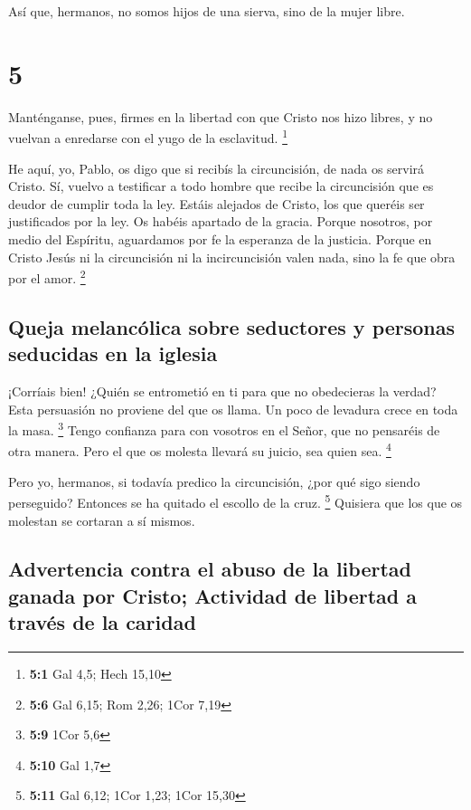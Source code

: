  Así que, hermanos, no somos hijos de una sierva, sino de
la mujer libre.

\hypertarget{section-4}{%
\section{5}\label{section-4}}

 Manténganse, pues, firmes en la libertad con que Cristo
nos hizo libres, y no vuelvan a enredarse con el yugo de la esclavitud.
\footnote{\textbf{5:1} Gal 4,5; Hech 15,10}

 He aquí, yo, Pablo, os digo que si recibís la
circuncisión, de nada os servirá Cristo.  Sí, vuelvo a
testificar a todo hombre que recibe la circuncisión que es deudor de
cumplir toda la ley.  Estáis alejados de Cristo, los que
queréis ser justificados por la ley. Os habéis apartado de la gracia.
 Porque nosotros, por medio del Espíritu, aguardamos por
fe la esperanza de la justicia.  Porque en Cristo Jesús ni
la circuncisión ni la incircuncisión valen nada, sino la fe que obra por
el amor. \footnote{\textbf{5:6} Gal 6,15; Rom 2,26; 1Cor 7,19}

\hypertarget{queja-melancuxf3lica-sobre-seductores-y-personas-seducidas-en-la-iglesia}{%
\subsection{Queja melancólica sobre seductores y personas seducidas en
la
iglesia}\label{queja-melancuxf3lica-sobre-seductores-y-personas-seducidas-en-la-iglesia}}

 ¡Corríais bien! ¿Quién se entrometió en ti para que no
obedecieras la verdad?  Esta persuasión no proviene del
que os llama.  Un poco de levadura crece en toda la masa.
\footnote{\textbf{5:9} 1Cor 5,6}  Tengo confianza para
con vosotros en el Señor, que no pensaréis de otra manera. Pero el que
os molesta llevará su juicio, sea quien sea. \footnote{\textbf{5:10} Gal
  1,7}

 Pero yo, hermanos, si todavía predico la circuncisión,
¿por qué sigo siendo perseguido? Entonces se ha quitado el escollo de la
cruz. \footnote{\textbf{5:11} Gal 6,12; 1Cor 1,23; 1Cor 15,30}
 Quisiera que los que os molestan se cortaran a sí
mismos.

\hypertarget{advertencia-contra-el-abuso-de-la-libertad-ganada-por-cristo-actividad-de-libertad-a-travuxe9s-de-la-caridad}{%
\subsection{Advertencia contra el abuso de la libertad ganada por
Cristo; Actividad de libertad a través de la
caridad}\label{advertencia-contra-el-abuso-de-la-libertad-ganada-por-cristo-actividad-de-libertad-a-travuxe9s-de-la-caridad}}

